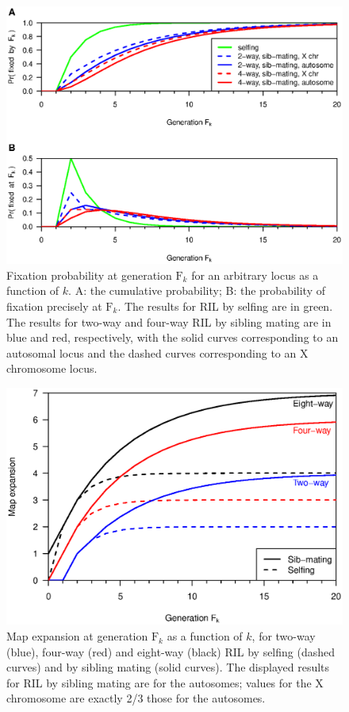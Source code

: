 \documentclass[12pt,letterpaper]{article}
\begin{document}
\begin{figure}
\centering
\includegraphics[width=\textwidth]{Figs/fixation_time.eps}

\bigskip
\caption{Fixation probability at generation $\text{F}_k$ for an arbitrary locus 
  as a function of $k$.  A: the cumulative probability; B:
  the probability of fixation precisely at $\text{F}_k$.
  The results for RIL by selfing are in green.  The results for
  two-way and four-way RIL by sibling mating are in blue and red,
  respectively, with the solid curves corresponding to an autosomal
  locus and the dashed curves corresponding to an X chromosome locus.\label{fig:fixation}}
\end{figure}



\clearpage

\begin{figure}
\centering
\includegraphics[width=\textwidth]{Figs/map_expansion.eps}

\bigskip
\caption{Map expansion at generation $\text{F}_k$ as a function of
  $k$, for two-way (blue), four-way (red) and eight-way 
  (black) RIL by selfing (dashed curves) and by sibling mating (solid
  curves).  The displayed results for RIL by sibling mating are for the
  autosomes; values for the X chromosome are exactly 2/3 those for the
  autosomes.\label{fig:mapexpansion}}
\end{figure}
\end{document}
